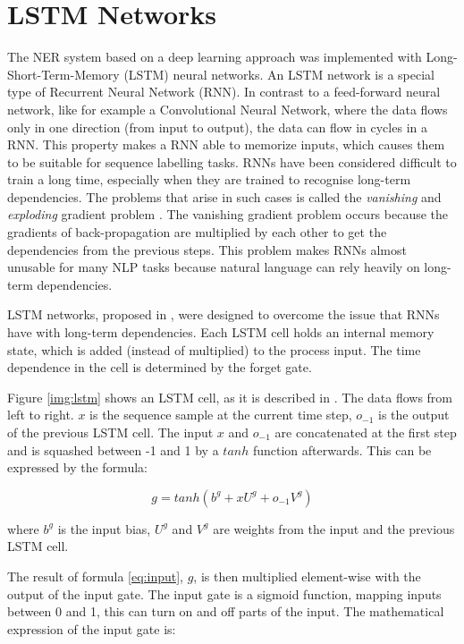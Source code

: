 \documentclass[12pt]{book}
\begin{document}
	\section{LSTM Networks}
	\label{sec:lstm}
	
	The NER system based on a deep learning approach was implemented with Long-Short-Term-Memory (LSTM) neural networks.
	An LSTM network is a special type of Recurrent Neural Network (RNN). In contrast to a feed-forward neural network, like for example a Convolutional Neural Network, where the data flows only in one direction (from input to output), the data can flow in cycles in a RNN. This property makes a RNN able to memorize inputs, which causes them to be suitable for sequence labelling tasks.
	RNNs have been considered difficult to train a long time, especially when they are trained to recognise long-term dependencies. The problems that arise in such cases is called the \textit{vanishing} and \textit{exploding} gradient problem \cite{lipton2015critical}. The vanishing gradient problem occurs because the gradients of back-propagation are multiplied by each other to get the dependencies from the previous steps. This problem makes RNNs almost unusable for many NLP tasks because natural language can rely heavily on long-term dependencies.
	
	LSTM networks, proposed in \cite{hochreiter1997long}, were designed to overcome the issue that RNNs have with long-term dependencies. Each LSTM cell holds an internal memory state, which is added (instead of multiplied) to the process input. The time dependence in the cell is determined by the forget gate.
	
	Figure \ref{img:lstm} shows an LSTM cell, as it is described in \cite{huang2015bidirectional}. The data flows from left to right. $x$ is the sequence sample at the current time step, $o_{-1}$ is the output of the previous LSTM cell. The input $x$ and $o_{-1}$ are concatenated at the first step and is squashed between -1 and 1 by a $tanh$ function afterwards. This can be expressed by the formula:
	
	\begin{equation}
		g = tanh(b^g + x U^g + o_{-1} V^g)
		\label{eq:input}
	\end{equation}
	
	where $b^g$ is the input bias, $U^g$ and $V^g$ are weights from the input and the previous LSTM cell.
	
	The result of formula \ref{eq:input}, $g$, is then multiplied element-wise with the output of the input gate. The input gate is a sigmoid function, mapping inputs between 0 and 1, this can turn on and off parts of the input. The mathematical expression of the input gate is:
	
\end{document}
